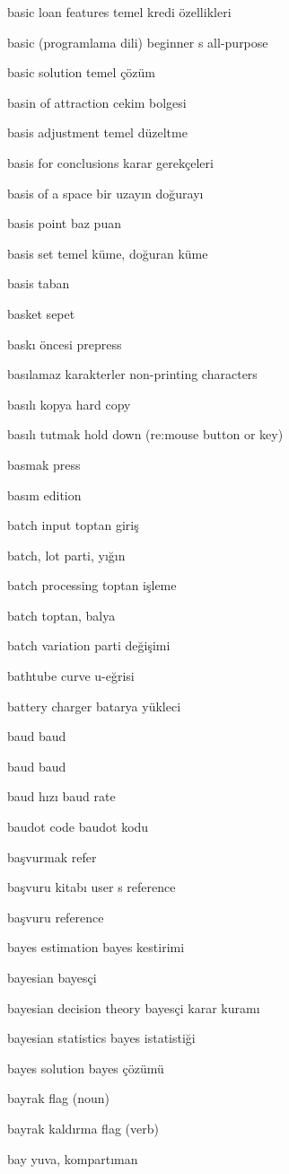 \documentclass[12pt,fleqn]{article}\usepackage{../../common}
\begin{document}
basic loan features temel kredi özellikleri

basic (programlama dili) beginner s all-purpose

basic solution temel çözüm

basin of attraction cekim bolgesi

basis adjustment temel düzeltme

basis for conclusions karar gerekçeleri

basis of a space bir uzayın doğurayı

basis point baz puan

basis set temel küme, doğuran küme

basis taban

basket sepet

baskı öncesi prepress

basılamaz karakterler non-printing characters

basılı kopya hard copy

basılı tutmak hold down (re:mouse button or key)

basmak press

basım edition

batch input toptan giriş

batch, lot parti, yığın

batch processing toptan işleme

batch toptan, balya

batch variation parti değişimi

bathtube curve u-eğrisi

battery charger batarya yükleci

baud baud

baud baud

baud hızı baud rate

baudot code baudot kodu

başvurmak refer

başvuru kitabı user s reference

başvuru reference

bayes estimation bayes kestirimi

bayesian bayesçi

bayesian decision theory bayesçi karar kuramı

bayesian statistics bayes istatistiği

bayes solution bayes çözümü

bayrak flag (noun)

bayrak kaldırma flag (verb)

bay yuva, kompartıman
\end{document}
